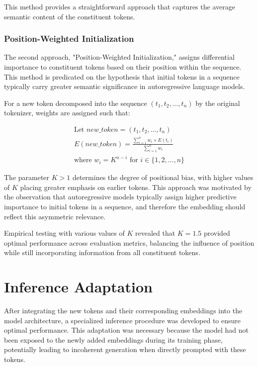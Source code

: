 This method provides a straightforward approach that captures the average semantic content of the constituent tokens.

\subsubsection{Position-Weighted Initialization}
The second approach, "Position-Weighted Initialization," assigns differential importance to constituent tokens based on their position within the sequence. This method is predicated on the hypothesis that initial tokens in a sequence typically carry greater semantic significance in autoregressive language models.

For a new token decomposed into the sequence $(t_1, t_2, \ldots, t_n)$ by the original tokenizer, weights are assigned such that:

$$
\begin{array}{c}
    \text{Let } new\_token = (t_1, t_2, \ldots, t_n) \\
    E(new\_token) = \frac{\sum_{i=1}^{n} w_i \times E(t_i)}{\sum_{i=1}^{n} w_i} \\
    \text{where } w_i = K^{n-i} \text{ for } i \in \{1,2,\ldots,n\}
\end{array}
$$

The parameter $K > 1$ determines the degree of positional bias, with higher values of $K$ placing greater emphasis on earlier tokens. This approach was motivated by the observation that autoregressive models typically assign higher predictive importance to initial tokens in a sequence, and therefore the embedding should reflect this asymmetric relevance.

Empirical testing with various values of $K$ revealed that $K = 1.5$ provided optimal performance across evaluation metrics, balancing the influence of position while still incorporating information from all constituent tokens.

\section{Inference Adaptation}
After integrating the new tokens and their corresponding embeddings into the model architecture, a specialized inference procedure was developed to ensure optimal performance. This adaptation was necessary because the model had not been exposed to the newly added embeddings during its training phase, potentially leading to incoherent generation when directly prompted with these tokens.


